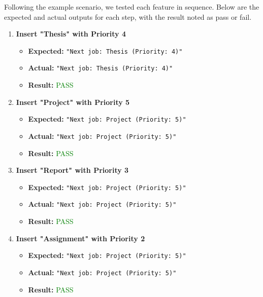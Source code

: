 \documentclass{article}
\begin{document}
Following the example scenario, we tested each feature in sequence. Below are the expected and actual outputs for each step, with the result noted as pass or fail.
\begin{enumerate}
    \item \textbf{Insert "Thesis" with Priority 4}
        \begin{itemize}
            \item \textbf{Expected:} \texttt{"Next job: Thesis (Priority: 4)"}
            \item \textbf{Actual:} \texttt{"Next job: Thesis (Priority: 4)"}
            \item \textbf{Result:} \textcolor{green}{PASS}
        \end{itemize}

    \item \textbf{Insert "Project" with Priority 5}
        \begin{itemize}
            \item \textbf{Expected:} \texttt{"Next job: Project (Priority: 5)"}
            \item \textbf{Actual:} \texttt{"Next job: Project (Priority: 5)"}
            \item \textbf{Result:} \textcolor{green}{PASS}
        \end{itemize}

    \item \textbf{Insert "Report" with Priority 3}
        \begin{itemize}
            \item \textbf{Expected:} \texttt{"Next job: Project (Priority: 5)"}
            \item \textbf{Actual:} \texttt{"Next job: Project (Priority: 5)"}
            \item \textbf{Result:} \textcolor{green}{PASS}
        \end{itemize}

    \item \textbf{Insert "Assignment" with Priority 2}
        \begin{itemize}
            \item \textbf{Expected:} \texttt{"Next job: Project (Priority: 5)"}
            \item \textbf{Actual:} \texttt{"Next job: Project (Priority: 5)"}
            \item \textbf{Result:} \textcolor{green}{PASS}
        \end{itemize}


\end{enumerate}
\end{document}
